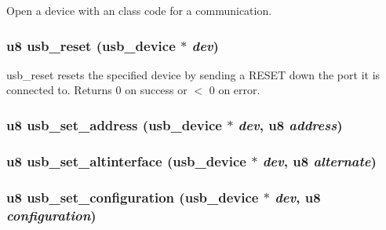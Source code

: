 Open a device with an class code for a communication. 
\subsubsection{\setlength{\rightskip}{0pt plus 5cm}u8 usb\_\-reset ({\bf usb\_\-device} $\ast$ {\em dev})}\label{usb_8c_cabbd669fcfbbd1ff806b37344c0486e}


usb\_\-reset resets the specified device by sending a RESET down the port it is connected to. Returns 0 on success or $<$ 0 on error. 
\subsubsection{\setlength{\rightskip}{0pt plus 5cm}u8 usb\_\-set\_\-address ({\bf usb\_\-device} $\ast$ {\em dev}, u8 {\em address})}\label{usb_8c_5a09d4be5e45fe503236041ada40405d}


\subsubsection{\setlength{\rightskip}{0pt plus 5cm}u8 usb\_\-set\_\-altinterface ({\bf usb\_\-device} $\ast$ {\em dev}, u8 {\em alternate})}\label{usb_8c_f61ea8d82c09b7bc9a7d5944ebe03c1c}


\subsubsection{\setlength{\rightskip}{0pt plus 5cm}u8 usb\_\-set\_\-configuration ({\bf usb\_\-device} $\ast$ {\em dev}, u8 {\em configuration})}\label{usb_8c_0d65fa2357fef7e70f480e6b479975cf}


